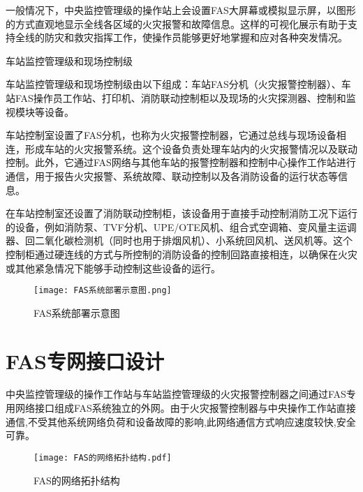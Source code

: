 一般情况下，中央监控管理级的操作站上会设置FAS大屏幕或模拟显示屏，以图形的方式直观地显示全线各区域的火灾报警和故障信息。这样的可视化展示有助于支持全线的防灾和救灾指挥工作，使操作员能够更好地掌握和应对各种突发情况。

车站监控管理级和现场控制级

车站监控管理级和现场控制级由以下组成：车站FAS分机（火灾报警控制器）、车站FAS操作员工作站、打印机、消防联动控制柜以及现场的火灾探测器、控制和监视模块等设备。

车站控制室设置了FAS分机，也称为火灾报警控制器，它通过总线与现场设备相连，形成车站的火灾报警系统。这个设备负责处理车站内的火灾报警情况以及联动控制。此外，它通过FAS网络与其他车站的报警控制器和控制中心操作工作站进行通信，用于报告火灾报警、系统故障、联动控制以及各消防设备的运行状态等信息。

在车站控制室还设置了消防联动控制柜，该设备用于直接手动控制消防工况下运行的设备，例如消防泵、TVF分机、UPE/OTE风机、组合式空调箱、变风量主运调器、回二氧化碳检测机（同时也用于排烟风机）、小系统回风机、送风机等。这个控制柜通过硬连线的方式与所控制的消防设备的控制回路直接相连，以确保在火灾或其他紧急情况下能够手动控制这些设备的运行。

\begin{figure}[h]
	\centering
	\texttt{[image: FAS系统部署示意图.png]}
	\label{FAS系统部署示意图}
	\caption{FAS系统部署示意图}
\end{figure}

\section{FAS专网接口设计}

中央监控管理级的操作工作站与车站监控管理级的火灾报警控制器之间通过FAS专用网络接口组成FAS系统独立的外网。由于火灾报警控制器与中央操作工作站直接通信,不受其他系统网络负荷和设备故障的影响,此网络通信方式响应速度较快,安全可靠。 

\begin{figure}[h]
	\centering
	\texttt{[image: FAS的网络拓扑结构.pdf]}
	\label{FAS的网络拓扑结构}
	\caption{FAS的网络拓扑结构}
\end{figure}

